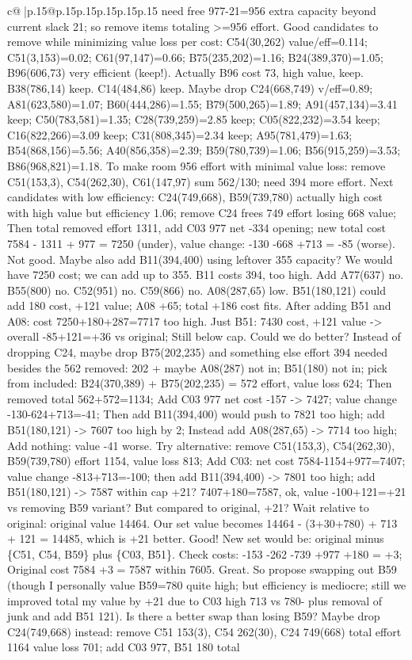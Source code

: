 \documentclass{article}
\begin{document}
{\begin{supertabular}{c@{$\;$}|p{.15\linewidth}@{}p{.15\linewidth}p{.15\linewidth}p{.15\linewidth}p{.15\linewidth}p{.15\linewidth}}
{{{need free 977{-}21=956 extra capacity beyond current slack 21; so remove items totaling >=956 effort. Good candidates to remove while minimizing value loss per cost: C54(30,262) value/eff=0.114; C51(3,153)=0.02; C61(97,147)=0.66; B75(235,202)=1.16; B24(389,370)=1.05; B96(606,73) very efficient (keep!). Actually B96 cost 73, high value, keep. B38(786,14) keep. C14(484,86) keep. Maybe drop C24(668,749) v/eff=0.89; A81(623,580)=1.07; B60(444,286)=1.55; B79(500,265)=1.89; A91(457,134)=3.41 keep; C50(783,581)=1.35; C28(739,259)=2.85 keep; C05(822,232)=3.54 keep; C16(822,266)=3.09 keep; C31(808,345)=2.34 keep; A95(781,479)=1.63; B54(868,156)=5.56; A40(856,358)=2.39; B59(780,739)=1.06; B56(915,259)=3.53; B86(968,821)=1.18. To make room 956 effort with minimal value loss: remove C51(153,3), C54(262,30), C61(147,97) sum 562/130; need 394 more effort. Next candidates with low efficiency: C24(749,668), B59(739,780) actually high cost with high value but efficiency 1.06; remove C24 frees 749 effort losing 668 value; Then total removed effort 1311, add C03 977 net {-}334 opening; new total cost 7584 {-} 1311 + 977 = 7250 (under), value change: {-}130 {-}668 +713 = {-}85 (worse). Not good. Maybe also add B11(394,400) using leftover 355 capacity? We would have 7250 cost; we can add up to 355. B11 costs 394, too high. Add A77(637) no. B55(800) no. C52(951) no. C59(866) no. A08(287,65) low. B51(180,121) could add 180 cost, +121 value; A08 +65; total +186 cost fits. After adding B51 and A08: cost 7250+180+287=7717 too high. Just B51: 7430 cost, +121 value {-}> overall {-}85+121=+36 vs original; Still below cap. Could we do better? Instead of dropping C24, maybe drop B75(202,235) and something else effort 394 needed besides the 562 removed: 202 + maybe A08(287) not in; B51(180) not in; pick from included: B24(370,389) + B75(202,235) = 572 effort, value loss 624; Then removed total 562+572=1134; Add C03 977 net cost {-}157 {-}> 7427; value change {-}130{-}624+713={-}41; Then add B11(394,400) would push to 7821 too high; add B51(180,121) {-}> 7607 too high by 2; Instead add A08(287,65) {-}> 7714 too high; Add nothing: value {-}41 worse. Try alternative: remove C51(153,3), C54(262,30), B59(739,780) effort 1154, value loss 813; Add C03: net cost 7584{-}1154+977=7407; value change {-}813+713={-}100; then add B11(394,400) {-}> 7801 too high; add B51(180,121) {-}> 7587 within cap +21? 7407+180=7587, ok, value {-}100+121=+21 vs removing B59 variant? But compared to original, +21? Wait relative to original: original value 14464. Our set value becomes 14464 {-} (3+30+780) + 713 + 121 = 14485, which is +21 better. Good! New set would be: original minus \{C51, C54, B59\} plus \{C03, B51\}. Check costs: {-}153 {-}262 {-}739 +977 +180 = +3; Original cost 7584 +3 = 7587 within 7605. Great. So propose swapping out B59 (though I personally value B59=780 quite high; but efficiency is mediocre; still we improved total my value by +21 due to C03 high 713 vs 780{-} plus removal of junk and add B51 121). Is there a better swap than losing B59? Maybe drop C24(749,668) instead: remove C51 153(3), C54 262(30), C24 749(668) total effort 1164 value loss 701; add C03 977, B51 180 total }}}
\end{supertabular}}
\end{document}
